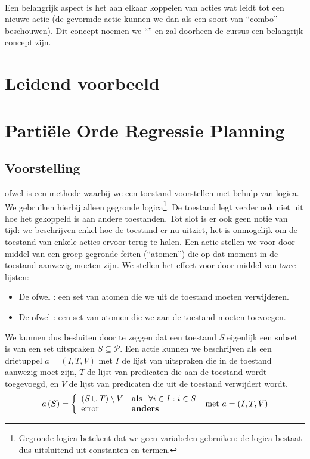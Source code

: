 \paragraph{}Een belangrijk aspect is het aan elkaar koppelen van acties wat leidt tot een nieuwe actie (de gevormde actie kunnen we dan als een soort van ``combo'' beschouwen). Dit concept noemen we ``'' en zal doorheen de cursus een belangrijk concept zijn.
\section{Leidend voorbeeld}
\section{Parti\"ele Orde Regressie Planning}
\subsection{Voorstelling}
 ofwel  is een methode waarbij we een toestand voorstellen met behulp van logica. We gebruiken hierbij alleen gegronde logica\footnote{Gegronde logica betekent dat we geen variabelen gebruiken: de logica bestaat dus uitsluitend uit constanten en termen.}. De toestand legt verder ook niet uit hoe het gekoppeld is aan andere toestanden. Tot slot is er ook geen notie van tijd: we beschrijven enkel hoe de toestand er nu uitziet, het is onmogelijk om de toestand van enkele acties ervoor terug te halen. Een actie stellen we voor door middel van een groep gegronde feiten (``atomen'') die op dat moment in de toestand aanwezig moeten zijn. We stellen het effect voor door middel van twee lijsten:
\begin{itemize}
 \item De  ofwel : een set van atomen die we uit de toestand moeten verwijderen.
 \item De  ofwel : een set van atomen die we aan de toestand moeten toevoegen.
\end{itemize}
We kunnen dus besluiten door te zeggen dat een toestand $S$ eigenlijk een subset is van een set uitspraken $S\subseteq\mathcal{P}$. Een actie kunnen we beschrijven als een drietuppel $a=\left(I,T,V\right)$ met $I$ de lijst van uitspraken die in de toestand aanwezig moet zijn, $T$ de lijst van predicaten die aan de toestand wordt toegevoegd, en $V$ de lijst van predicaten die uit de toestand verwijdert wordt.
\begin{equation}
a\left(S\right)=\left\{\begin{array}{ll}
\left(S\cup T\right)\setminus V&\mbox{\bf als }\ \forall i\in I:i\in S\\
\mbox{error}&\mbox{\bf anders }
\end{array}\right.\mbox{ met }a=\left(I,T,V\right)
\end{equation}
